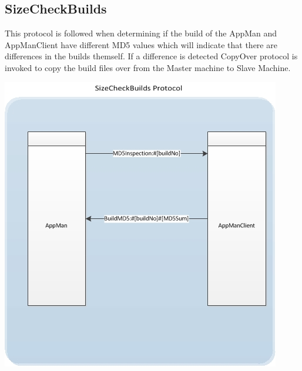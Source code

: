 \documentclass[a4paper,12pt,final]{article}
\begin{document}
\subsection{SizeCheckBuilds}
This protocol is followed when determining if the build of the AppMan and AppManClient have different MD5 values which will indicate that there are differences in the builds themself. If a difference is detected CopyOver protocol is invoked to copy the build files over from the Master machine to Slave Machine.
\begin{center}
\includegraphics[scale=1.0]{CommunicationProtocol/SizeCheckBuildsProtocol.jpg} 
\end{center}
\end{document}
